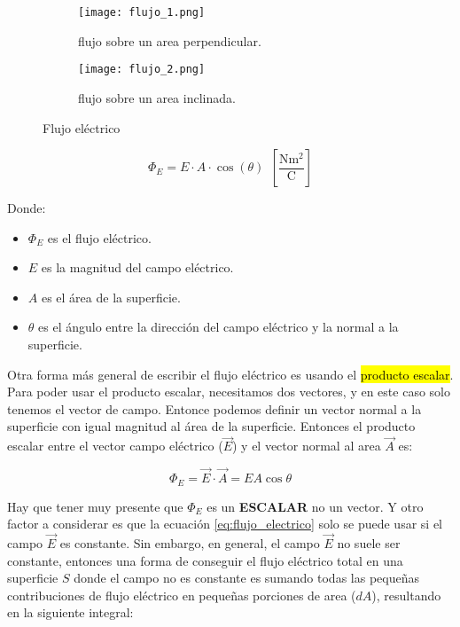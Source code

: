 \begin{figure}[ht!]
    \centering
    \begin{subfigure}[b]{0.45\textwidth}
        \centering
        \texttt{[image: flujo\_1.png]}
        \caption{flujo sobre un area perpendicular.}
        \label{fig:flujo1}
    \end{subfigure}
    \hfill
    \begin{subfigure}[b]{0.45\textwidth}
        \centering
        \texttt{[image: flujo\_2.png]}
        \caption{flujo sobre un area inclinada.}
        \label{fig:flujo2}
    \end{subfigure}
    \caption{Flujo eléctrico}
    \label{fig:flujo eléctrico}
\end{figure}

\[
\Phi_E = E \cdot A \cdot \cos(\theta)  ~~ \left[\frac{\si{\newton \meter \squared}}{\si{\coulomb}}\right]
\]

Donde:
\begin{itemize}
    \item \(\Phi_E\) es el flujo eléctrico.
    \item \(E\) es la magnitud del campo eléctrico.
    \item \(A\) es el área de la superficie.
    \item \(\theta\) es el ángulo entre la dirección del campo eléctrico y la normal a la superficie.
\end{itemize}

Otra forma más general de escribir el flujo eléctrico es usando el \hl{producto escalar}. Para poder usar el producto escalar, necesitamos dos vectores, y en este caso solo tenemos el vector de campo. Entonce podemos definir un vector normal a la superficie con igual magnitud al área de la superficie. Entonces el producto escalar entre el vector campo eléctrico (\(\vec{E}\)) y el vector normal al area \(\vec{A}\) es:

\begin{equation}
    \Phi_E = \vec{E} \cdot \vec{A} = E A \cos \theta
    \label{eq:flujo_electrico}
\end{equation}

Hay que tener muy presente que \(\Phi_E\) es un \textbf{ESCALAR} no un vector. Y otro factor a considerar es que la ecuación \eqref{eq:flujo_electrico} solo se puede usar si el campo \(\vec{E}\) es constante. Sin embargo, en general, el campo \(\vec{E}\) no suele ser constante, entonces una forma de conseguir el flujo eléctrico total en una superficie \(S\) donde el campo no es constante es sumando todas las pequeñas contribuciones de flujo eléctrico en pequeñas porciones de area (\(dA\)), resultando en la siguiente integral:

